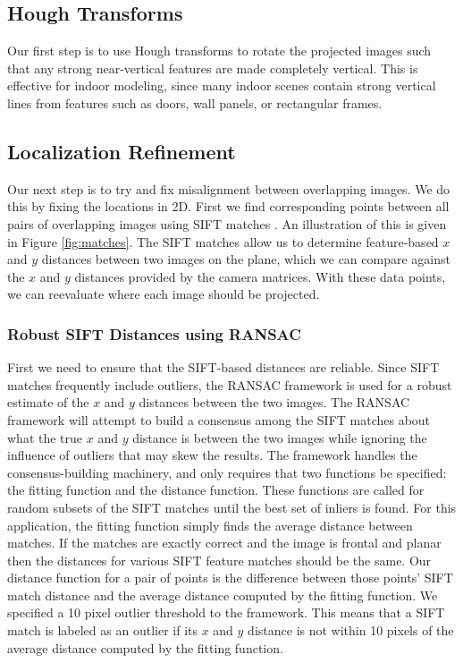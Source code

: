 \documentclass[10pt,twocolumn,letterpaper]{article}
\begin{document}
\subsection{Hough Transforms}
Our first step is to use Hough transforms to rotate the projected
images such that any strong near-vertical features are made completely
vertical. This is effective for indoor modeling, since many indoor
scenes contain strong vertical lines from features such as doors, wall
panels, or rectangular frames.


\subsection{Localization Refinement}
Our next step is to try and fix misalignment between overlapping
images.  We do this by fixing the locations in 2D. First we find
corresponding points between all pairs of overlapping images using
SIFT matches \cite{lowe1999object}. An illustration of this is given
in Figure \ref{fig:matches}. The SIFT matches allow us to determine
feature-based $x$ and $y$ distances between two images on the plane,
which we can compare against the $x$ and $y$ distances provided by the
camera matrices. With these data points, we can reevaluate where each
image should be projected.

\subsubsection{Robust SIFT Distances using RANSAC}

First we need to ensure that the SIFT-based distances are
reliable. Since SIFT matches frequently include outliers, the RANSAC
framework \cite{fischler1981random} is used for a robust estimate of
the $x$ and $y$ distances between the two images. The RANSAC framework
will attempt to build a consensus among the SIFT matches about what
the true $x$ and $y$ distance is between the two images while ignoring
the influence of outliers that may skew the results. The framework
handles the consensus-building machinery, and only requires that two
functions be specified: the fitting function and the distance
function. These functions are called for random subsets of the SIFT
matches until the best set of inliers is found. For this application,
the fitting function simply finds the average distance between
matches. If the matches are exactly correct and the image is frontal
and planar then the distances for various SIFT feature matches should
be the same. Our distance function for a pair of points is the
difference between those points' SIFT match distance and the average
distance computed by the fitting function. We specified a 10 pixel
outlier threshold to the framework. This means that a SIFT match is
labeled as an outlier if its $x$ and $y$ distance is not within 10
pixels of the average distance computed by the fitting function.
\end{document}
